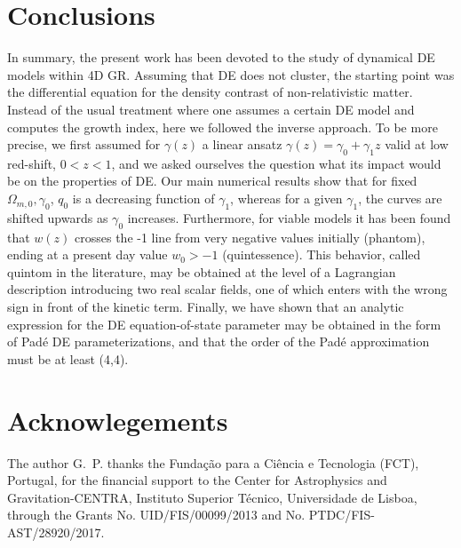 \documentclass[aps,prd,amsmath,amssymb]{revtex4}
\begin{document}



\section{Conclusions}

In summary, the present work has been devoted to the study of dynamical DE models within 4D GR.
Assuming that DE does not cluster, the starting point was the differential equation for the density
contrast of non-relativistic matter. Instead of the usual treatment where one assumes a certain
DE model and computes the growth index, here we followed the inverse approach. To be more precise,
we first assumed for $\gamma(z)$ a linear ansatz $\gamma(z)=\gamma_0+\gamma_1 z$ valid at low red-shift, 
$0 < z < 1$, and we asked ourselves the question what its impact would be on the properties of DE. Our main 
numerical results show that for fixed $\Omega_{m,0}, \gamma_0$, $q_0$ is a decreasing function of $\gamma_1$, whereas
for a given $\gamma_1$, the curves are shifted upwards as $\gamma_0$ increases. Furthermore, for
viable models it has been found that $w(z)$ crosses the -1 line from very negative values initially (phantom), 
ending at a present day value $w_0 > -1$ (quintessence). This behavior, called quintom in the literature,
may be obtained at the level of a Lagrangian description introducing two real scalar fields, one of which enters
with the wrong sign in front of the kinetic term. Finally, we have shown that an analytic expression for the 
DE equation-of-state parameter may be obtained in the form of Pad{\'e} DE parameterizations, and that the 
order of the Pad{\'e} approximation must be at least (4,4).




\section*{Acknowlegements}

The author G.~P. thanks the Fun\-da\c c\~ao para a Ci\^encia e Tecnologia (FCT), Portugal, 
for the financial support to the Center for Astrophysics and Gravitation-CENTRA, Instituto 
Superior T\'ecnico, Universidade de Lisboa, through the Grants No. UID/FIS/00099/2013 and 
No. PTDC/FIS-AST/28920/2017. 
\end{document}
